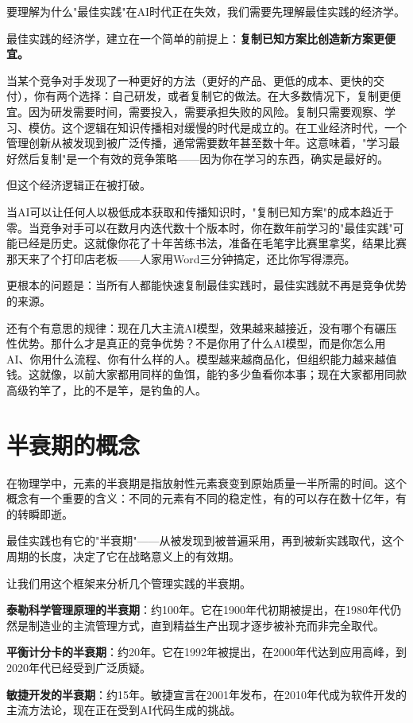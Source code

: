 要理解为什么"最佳实践"在AI时代正在失效，我们需要先理解最佳实践的经济学。

最佳实践的经济学，建立在一个简单的前提上：\textbf{复制已知方案比创造新方案更便宜。}

当某个竞争对手发现了一种更好的方法（更好的产品、更低的成本、更快的交付），你有两个选择：自己研发，或者复制它的做法。在大多数情况下，复制更便宜。因为研发需要时间，需要投入，需要承担失败的风险。复制只需要观察、学习、模仿。这个逻辑在知识传播相对缓慢的时代是成立的。在工业经济时代，一个管理创新从被发现到被广泛传播，通常需要数年甚至数十年。这意味着，"学习最好然后复制"是一个有效的竞争策略——因为你在学习的东西，确实是最好的。

但这个经济逻辑正在被打破。

当AI可以让任何人以极低成本获取和传播知识时，"复制已知方案"的成本趋近于零。当竞争对手可以在数月内迭代数十个版本时，你在数年前学习的"最佳实践"可能已经是历史。这就像你花了十年苦练书法，准备在毛笔字比赛里拿奖，结果比赛那天来了个打印店老板——人家用Word三分钟搞定，还比你写得漂亮。

更根本的问题是：当所有人都能快速复制最佳实践时，最佳实践就不再是竞争优势的来源。

还有个有意思的规律：现在几大主流AI模型，效果越来越接近，没有哪个有碾压性优势。那什么才是真正的竞争优势？不是你用了什么AI模型，而是你怎么用AI、你用什么流程、你有什么样的人。模型越来越商品化，但组织能力越来越值钱。这就像，以前大家都用同样的鱼饵，能钓多少鱼看你本事；现在大家都用同款高级钓竿了，比的不是竿，是钓鱼的人。

\section{半衰期的概念}


在物理学中，元素的半衰期是指放射性元素衰变到原始质量一半所需的时间。这个概念有一个重要的含义：不同的元素有不同的稳定性，有的可以存在数十亿年，有的转瞬即逝。

最佳实践也有它的"半衰期"——从被发现到被普遍采用，再到被新实践取代，这个周期的长度，决定了它在战略意义上的有效期。

让我们用这个框架来分析几个管理实践的半衰期。

\textbf{泰勒科学管理原理的半衰期}：约100年。它在1900年代初期被提出，在1980年代仍然是制造业的主流管理方式，直到精益生产出现才逐步被补充而非完全取代。

\textbf{平衡计分卡的半衰期}：约20年。它在1992年被提出，在2000年代达到应用高峰，到2020年代已经受到广泛质疑。

\textbf{敏捷开发的半衰期}：约15年。敏捷宣言在2001年发布，在2010年代成为软件开发的主流方法论，现在正在受到AI代码生成的挑战。

